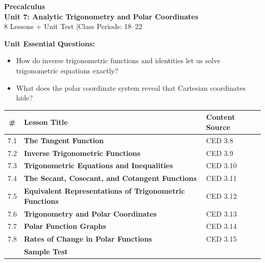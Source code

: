 \documentclass[10pt]{article}
\begin{document}
\thispagestyle{empty}

\vspace{-1.05in}

\begin{center}
  {\color{white}\textbf{\LARGE Precalculus}}\\[6pt]
  {\color{skymid}\Large\textbf{Unit 7: Analytic Trigonometry and Polar Coordinates}}\\[4pt]
  {\color{white}\small 8 Lessons + Unit Test \quad|\quad Class Periods: 18--22}
\end{center}

\vspace{0.26in}

\begin{tcolorbox}[colback=goldbg, colframe=goldacc, boxrule=0.8pt, arc=2mm,
    left=3mm, right=3mm, top=2mm, bottom=2mm]
\small\textbf{Unit Essential Questions:}
\begin{itemize}[leftmargin=1.4em, itemsep=2pt, topsep=2pt]
  \item How do inverse trigonometric functions and identities let us solve trigonometric equations exactly?
  \item What does the polar coordinate system reveal that Cartesian coordinates hide?
\end{itemize}
\end{tcolorbox}

\vspace{0.14in}

\begin{tocbox}
\small
\renewcommand{\arraystretch}{1.45}
\begin{tabularx}{\linewidth}{@{} c >{\bfseries}X l @{}}
\rowcolor{sky}
\textbf{\#} & \textbf{Lesson Title} & \textbf{Content Source} \\
\midrule
7.1 & The Tangent Function & CED 3.8 \\
7.2 & Inverse Trigonometric Functions & CED 3.9 \\
7.3 & Trigonometric Equations and Inequalities & CED 3.10 \\
7.4 & The Secant, Cosecant, and Cotangent Functions & CED 3.11 \\
7.5 & Equivalent Representations of Trigonometric Functions & CED 3.12 \\
7.6 & Trigonometry and Polar Coordinates & CED 3.13 \\
7.7 & Polar Function Graphs & CED 3.14 \\
7.8 & Rates of Change in Polar Functions & CED 3.15 \\
\midrule
\rowcolor{sky}
     & \textbf{Sample Test} &      \\
\end{tabularx}
\end{tocbox}
\end{document}
